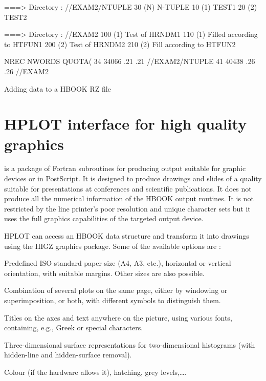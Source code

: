 \begin{Fighere}
\begin{XMP}
 
===> Directory : //EXAM2/NTUPLE
        30 (N)   N-TUPLE
        10 (1)   TEST1
        20 (2)   TEST2
 
===> Directory : //EXAM2
       100 (1)   Test of HRNDM1
       110 (1)   Filled according to HTFUN1
       200 (2)   Test of HRNDM2
       210 (2)   Fill according to HTFUN2
 
 
      NREC    NWORDS    QUOTA(%
       34      34066       .21      .21   //EXAM2/NTUPLE
       41      40438       .26      .26   //EXAM2
 
\end{XMP}
\caption{Adding data to a HBOOK RZ file}
\label{FEX2IN}
\end{Fighere}

\finalnewpage%

\section{HPLOT interface for high quality graphics}
\label{HPLOTINT}

\HPLOT{} is a package of Fortran subroutines for producing
\HBOOK{} output suitable for graphic devices or in PostScript.
It is designed to produce drawings
and slides of a quality suitable for presentations
at conferences and scientific publications.
It does not produce all the numerical information of the
HBOOK output routines.
It is not restricted by the line printer's
poor resolution and unique character sets but it uses the 
full graphics capabilities of the targeted output device.
      
HPLOT can access an HBOOK data structure and transform it
into drawings using the HIGZ graphics package.
Some of the available options are :
\begin{UL}
\item Predefined ISO standard paper size (A4, A3, etc.), horizontal or
      vertical orientation, with suitable margins.
      Other sizes are also possible.
\item Combination of several plots on the same page, either by
      windowing or superimposition, or both, with different symbols
      to distinguish them.
\item Titles on the axes and text anywhere on the picture,
      using various fonts, containing, e.g., Greek or special characters.
\item Three-dimensional surface representations
      for two-dimensional histograms (with
      hidden-line and hidden-surface removal).
\item Colour (if the hardware allows it), hatching, grey levels,\ldots.
\end{UL}

